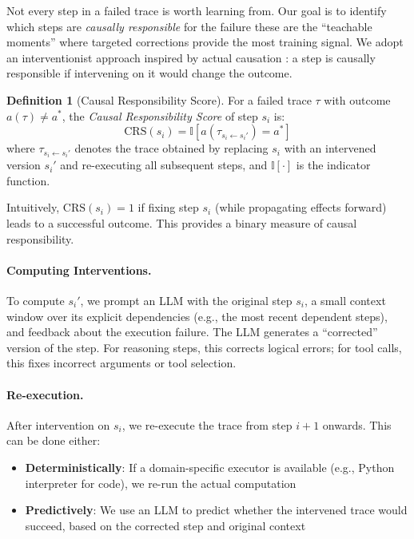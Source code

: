 \documentclass{article}
\theoremstyle{plain}
\theoremstyle{definition}
\newtheorem{definition}[theorem]{Definition}
\theoremstyle{remark}
\begin{document}
Not every step in a failed trace is worth learning from. Our goal is to identify which steps are \emph{causally responsible} for the failure these are the ``teachable moments'' where targeted corrections provide the most training signal. We adopt an interventionist approach inspired by actual causation \cite{halpern2005causes}: a step is causally responsible if intervening on it would change the outcome.

\begin{definition}[Causal Responsibility Score]
For a failed trace $\tau$ with outcome $a(\tau) \neq a^*$, the \emph{Causal Responsibility Score} of step $s_i$ is:
\begin{equation}
    \text{CRS}(s_i) = \mathbb{I}\left[ a(\tau_{s_i \leftarrow s_i'}) = a^* \right]
\end{equation}
where $\tau_{s_i \leftarrow s_i'}$ denotes the trace obtained by replacing $s_i$ with an intervened version $s_i'$ and re-executing all subsequent steps, and $\mathbb{I}[\cdot]$ is the indicator function.
\end{definition}

Intuitively, $\text{CRS}(s_i) = 1$ if fixing step $s_i$ (while propagating effects forward) leads to a successful outcome. This provides a binary measure of causal responsibility.

\paragraph{Computing Interventions.}
To compute $s_i'$, we prompt an LLM with the original step $s_i$, a small context window over its explicit dependencies (e.g., the most recent dependent steps), and feedback about the execution failure. The LLM generates a ``corrected'' version of the step. For reasoning steps, this corrects logical errors; for tool calls, this fixes incorrect arguments or tool selection.

\paragraph{Re-execution.}
After intervention on $s_i$, we re-execute the trace from step $i+1$ onwards. This can be done either:
\begin{itemize}
    \item \textbf{Deterministically}: If a domain-specific executor is available (e.g., Python interpreter for code), we re-run the actual computation
    \item \textbf{Predictively}: We use an LLM to predict whether the intervened trace would succeed, based on the corrected step and original context
\end{itemize}
\end{document}
